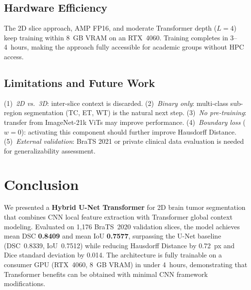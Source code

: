 \documentclass[10pt,twocolumn]{article}
\begin{document}
\subsection{Hardware Efficiency}
The 2D slice approach, AMP FP16, and moderate Transformer depth ($L=4$) keep training
within 8~GB VRAM on an RTX~4060. Training completes in 3--4~hours, making the approach
fully accessible for academic groups without HPC access.

\subsection{Limitations and Future Work}
(1)~\textit{2D vs.\ 3D}: inter-slice context is discarded.
(2)~\textit{Binary only}: multi-class sub-region segmentation (TC, ET, WT) is the
natural next step.
(3)~\textit{No pre-training}: transfer from ImageNet-21k ViTs may improve performance.
(4)~\textit{Boundary loss} ($w=0$): activating this component should further improve
Hausdorff Distance.
(5)~\textit{External validation}: BraTS 2021 or private clinical data evaluation is
needed for generalizability assessment.

\section{Conclusion}

We presented a \textbf{Hybrid U-Net Transformer} for 2D brain tumor segmentation that
combines CNN local feature extraction with Transformer global context modeling.
Evaluated on 1{,}176 BraTS~2020 validation slices, the model achieves mean DSC
\textbf{0.8409} and mean IoU \textbf{0.7577}, surpassing the U-Net baseline
(DSC~0.8339, IoU~0.7512) while reducing Hausdorff Distance by 0.72~px and Dice
standard deviation by 0.014. The architecture is fully trainable on a consumer GPU
(RTX~4060, 8~GB VRAM) in under 4~hours, demonstrating that Transformer benefits can be
obtained with minimal CNN framework modifications.
\end{document}
